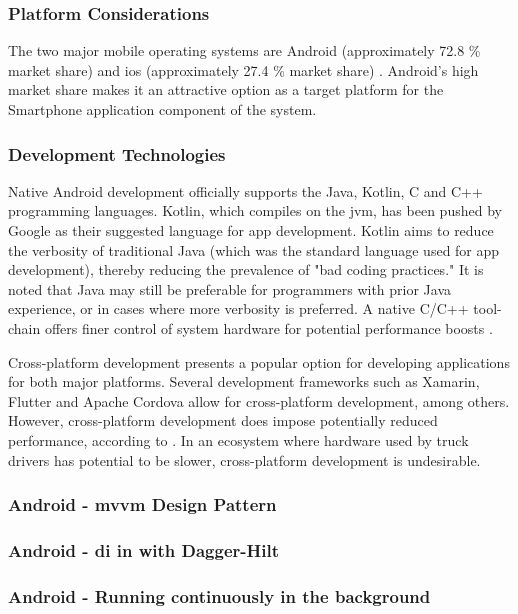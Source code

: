 \subsubsection{Platform Considerations}
The two major mobile operating systems are Android (approximately 72.8 \% market share) and \ac{ios} (approximately 27.4 \% market share) \cite{statcountermaketshare}.
Android's high market share makes it an attractive option as a target platform for the Smartphone application component of the system.

\subsubsection{Development Technologies}
Native Android development officially supports the Java, Kotlin, C and C++ programming languages.
Kotlin, which compiles on the \ac{jvm}, has been pushed by Google as their suggested language for app development.
Kotlin aims to reduce the verbosity of traditional Java (which was the standard language used for app development), thereby reducing the prevalence of "bad coding practices." \cite{flauzino2018you}
It is noted that Java may still be preferable for programmers with prior Java experience, or in cases where more verbosity is preferred.
A native C/C++ tool-chain offers finer control of system hardware for potential performance boosts \cite{kwan2012google}.

Cross-platform development presents a popular option for developing applications for both major platforms.
Several development frameworks such as Xamarin, Flutter and Apache Cordova allow for cross-platform development, among others.
However, cross-platform development does impose potentially reduced performance, according to \cite{biorn2020empirical}.
In an ecosystem where hardware used by truck drivers has potential to be slower, cross-platform development is undesirable.

\subsubsection{Android - \Ac{mvvm} Design Pattern}

\subsubsection{Android - \ac{di} in with Dagger-Hilt}

\subsubsection{Android - Running continuously in the background}

